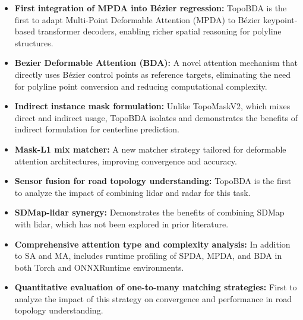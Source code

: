 \begin{itemize}
    \item \textbf{First integration of MPDA into Bézier regression:} TopoBDA is the first to adapt Multi-Point Deformable Attention (MPDA) to Bézier keypoint-based transformer decoders, enabling richer spatial reasoning for polyline structures.
    
    \item \textbf{Bezier Deformable Attention (BDA):} A novel attention mechanism that directly uses Bézier control points as reference targets, eliminating the need for polyline point conversion and reducing computational complexity.
    
    
    \item \textbf{Indirect instance mask formulation:} Unlike TopoMaskV2, which mixes direct and indirect usage, TopoBDA isolates and demonstrates the benefits of indirect formulation for centerline prediction.
    
    \item \textbf{Mask-L1 mix matcher:} A new matcher strategy tailored for deformable attention architectures, improving convergence and accuracy.
    
    \item \textbf{Sensor fusion for road topology understanding:} TopoBDA is the first to analyze the impact of combining lidar and radar for this task.
    
    \item \textbf{SDMap-lidar synergy:} Demonstrates the benefits of combining SDMap with lidar, which has not been explored in prior literature.
    
    \item \textbf{Comprehensive attention type and complexity analysis:} In addition to SA and MA, includes runtime profiling of SPDA, MPDA, and BDA in both Torch and ONNXRuntime environments.
    
    \item \textbf{Quantitative evaluation of one-to-many matching strategies:} First to analyze the impact of this strategy on convergence and performance in road topology understanding.
\end{itemize}
